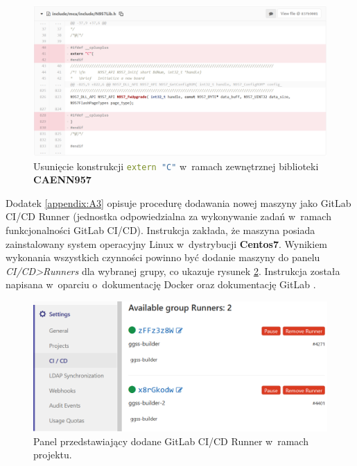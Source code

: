 \begin{figure}
\includegraphics[width=\textwidth]{res/png/removeExternC}
\caption{Usunięcie konstrukcji \lstinline[language=c++]{extern "C"} w~ramach zewnętrznej biblioteki \textbf{CAENN957}}
\label{fig:removeExternC}
\end{figure}

\onecolumn




\newpage





Dodatek \ref{appendix:A3} opisuje procedurę dodawania nowej maszyny jako GitLab CI/CD Runner (jednostka odpowiedzialna za wykonywanie zadań w~ramach funkcjonalności GitLab CI/CD). Instrukcja zakłada, że maszyna posiada zainstalowany system operacyjny Linux w~dystrybucji \textbf{Centos7}. Wynikiem wykonania wszystkich czynności powinno być dodanie maszyny do panelu \textit{CI/CD>Runners} dla wybranej grupy, co ukazuje rysunek \ref{fig:runner}. Instrukcja została napisana w~oparciu o~dokumentację Docker \cite{DockerInstall} oraz dokumentację GitLab \cite{RunnerRegister}.

\begin{figure}
\includegraphics[width=\textwidth]{res/png/runnerAdded}
\caption{Panel przedstawiający dodane GitLab CI/CD Runner w~ramach projektu.}
\label{fig:runner}
\end{figure}
